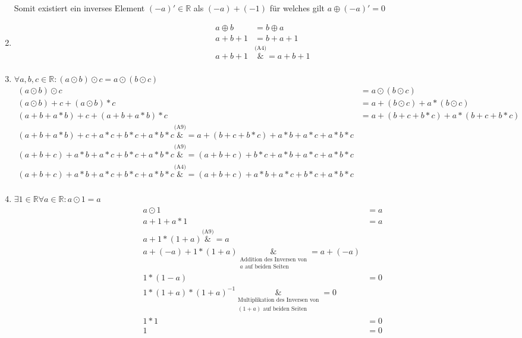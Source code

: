\documentclass{article}
\begin{document}
\begin{enumerate}[label=(A\arabic*)]
  Somit existiert ein inverses Element $(-a)' \in \mathbb{R}$ als $(-a) + (-1)$ für welches gilt
  $a \oplus (-a)' = 0$

\item
  \begin{align*}
    a \oplus b &= b \oplus a \\
    a + b + 1 &= b + a + 1 \\
    a + b + 1 &\overset{\text{(A4)}}&{=} a + b + 1 \\
  \end{align*}

\item $\forall a,b,c \in \mathbb{R} \colon (a \odot b) \odot c = a \odot (b \odot c)$
  \begin{align*}
    (a \odot b) \odot c &= a \odot (b \odot c) \\
    (a \odot b) + c + (a \odot b) * c &= a + (b \odot c) + a * (b \odot c) \\
    (a + b + a * b) + c + (a + b + a * b) * c &= a + (b + c + b * c) + a * (b + c + b * c) \\
    (a + b + a * b) + c + a * c + b * c + a * b * c \overset{\text{(A9)}}&{=} a + (b + c + b * c) + a * b + a * c + a* b * c \\
    (a + b + c) + a * b + a * c + b * c + a * b * c \overset{\text{(A9)}}&{=} (a + b + c) + b * c + a * b + a * c + a* b * c \\
    (a + b + c) + a * b + a * c + b * c + a * b * c \overset{\text{(A4)}}&{=} (a + b + c) + a * b + a * c + b * c + a * b * c \\
  \end{align*}
  
\item $\exists \mathit{1} \in \mathbb{R} \forall a \in \mathbb{R} \colon a \odot \mathit{1} = a$ \\

  \begin{align*}
    a \odot \mathit{1} &= a \\
    a + \mathit{1} + a * \mathit{1} &= a \\
    a + \mathit{1} * (1 + a) \overset{\text{(A9)}}&{=} a \\
    a + (-a) + \mathit{1} * (1 + a) \underset{\substack{\text{Addition des Inversen von} \\ a \text{ auf beiden Seiten}}}&{=} a + (-a) \\
    \mathit{1} * (1 - a) &= 0 \\
    \mathit{1} * (1 + a) * (1 + a)^{-1} \underset{\substack{\text{Multiplikation des Inversen von} \\ (1+a) \text{ auf beiden Seiten}}}&{=} 0 \\
    \mathit{1} * 1 &= 0 \\
    \mathit{1} &= 0 \\
  \end{align*}


\end{enumerate}
\end{document}
